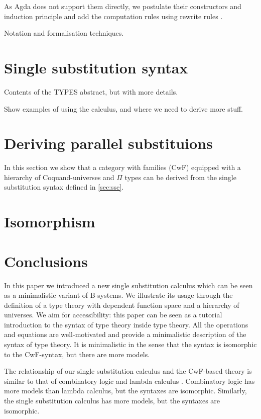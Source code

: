 \documentclass[sigplan,10pt,anonymous,review]{acmart}\settopmatter{printfolios=true,printccs=false,printacmref=false}
\begin{document}
As Agda does not support them directly, we postulate their
constructors and induction principle and add the computation rules
using rewrite rules \cite{DBLP:conf/types/Cockx19}.

Notation and formalisation techniques.

\section{Single substitution syntax}
\label{sec:ssc}

Contents of the TYPES abstract, but with more details.

Show examples of using the calculus, and where we need to derive more
stuff.

\section{Deriving parallel substituions}

In this section we show that a category with families (CwF) equipped
with a hierarchy of Coquand-universes and $\Pi$ types can be derived
from the single substitution syntax defined in \autoref{sec:ssc}.

\section{Isomorphism}

\section{Conclusions}
\label{sec:conclusion}

In this paper we introduced a new single substitution calculus which
can be seen as a minimalistic variant of B-systems. We illustrate its
usage through the definition of a type theory with dependent function
space and a hierarchy of universes. We aim for accessibility: this
paper can be seen as a tutorial introduction to the syntax of type
theory inside type theory. All the operations and equations are
well-motivated and provide a minimalistic description of the syntax of
type theory. It is minimalistic in the sense that the syntax is
isomorphic to the CwF-syntax, but there are more models. 

The relationship of our single substitution calculus and the CwF-based
theory is similar to that of combinatory logic and lambda calculus
\cite{DBLP:conf/fscd/AltenkirchKSV23}. Combinatory logic has more
models than lambda calculus, but the syntaxes are
isomorphic. Similarly, the single substitution calculus has more
models, but the syntaxes are isomorphic.
\end{document}
